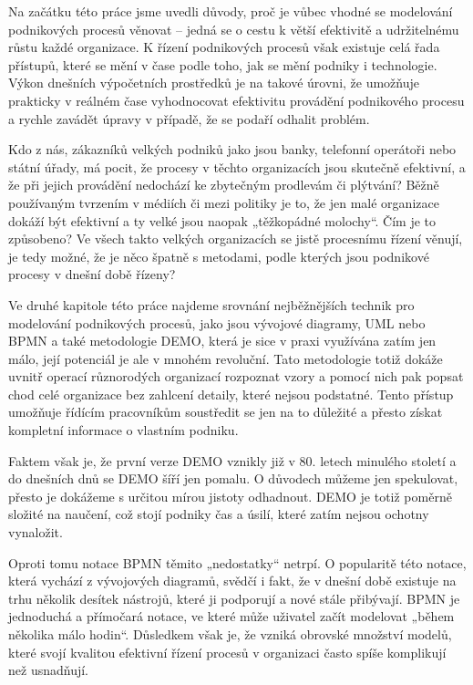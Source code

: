 Na začátku této práce jsme uvedli důvody, proč je vůbec vhodné se modelování podnikových procesů věnovat – jedná se o cestu k větší efektivitě a udržitelnému růstu každé organizace. K řízení podnikových procesů však existuje celá řada přístupů, které se mění v čase podle toho, jak se mění podniky i technologie. Výkon dnešních výpočetních prostředků je na takové úrovni, že umožňuje  prakticky v reálném čase vyhodnocovat efektivitu provádění podnikového procesu a rychle zavádět úpravy v případě, že se podaří odhalit problém.

Kdo z nás, zákazníků velkých podniků jako jsou banky, telefonní operátoři nebo státní úřady, má pocit, že procesy v těchto organizacích jsou skutečně efektivní, a že při jejich provádění nedochází ke zbytečným prodlevám či plýtvání? Běžně používaným tvrzením v médiích či mezi politiky je to, že jen malé organizace dokáží být efektivní a ty velké jsou naopak „těžkopádné molochy“. Čím je to způsobeno? Ve všech takto velkých organizacích se jistě procesnímu řízení věnují, je tedy možné, že je něco špatně s metodami, podle kterých jsou podnikové procesy v dnešní době řízeny?

Ve druhé kapitole této práce najdeme srovnání nejběžnějších technik pro modelování podnikových procesů, jako jsou vývojové diagramy, UML nebo BPMN a také metodologie DEMO, která je sice v praxi využívána zatím jen málo, její potenciál je ale v mnohém revoluční. Tato metodologie totiž dokáže uvnitř operací různorodých organizací rozpoznat vzory a pomocí nich pak popsat chod celé organizace bez zahlcení detaily, které nejsou podstatné. Tento přístup umožňuje řídícím pracovníkům soustředit se jen na to důležité a přesto získat kompletní informace o vlastním podniku.

Faktem však je, že první verze DEMO vznikly již v 80. letech minulého století a do dnešních dnů se DEMO šíří jen pomalu. O důvodech můžeme jen spekulovat, přesto je dokážeme s určitou mírou jistoty odhadnout. DEMO je totiž poměrně složité na naučení, což stojí podniky čas a úsilí, které zatím nejsou ochotny vynaložit.

Oproti tomu notace BPMN těmito „nedostatky“ netrpí. O popularitě této notace, která vychází z vývojových diagramů, svědčí i fakt, že v dnešní době existuje na trhu několik desítek nástrojů, které ji podporují a nové stále přibývají. BPMN je jednoduchá a přímočará notace, ve které může uživatel začít modelovat „během několika málo hodin“. Důsledkem však je, že vzniká obrovské množství modelů, které svojí kvalitou efektivní řízení procesů v organizaci často spíše komplikují než usnadňují.

